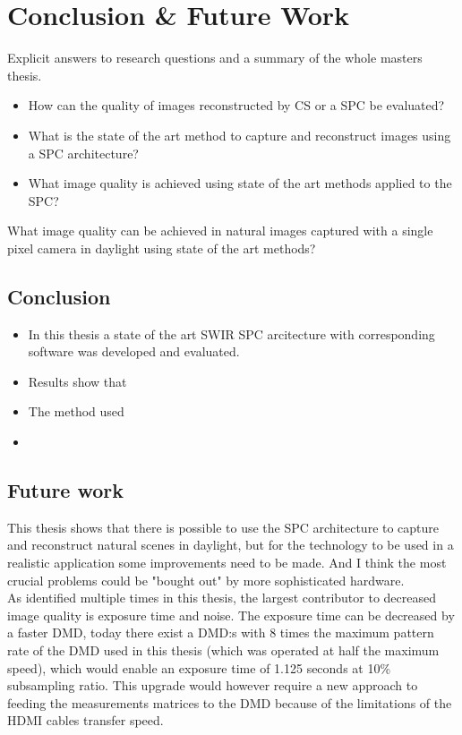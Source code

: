 \section{Conclusion \& Future Work}
Explicit answers to research questions and a summary of the whole masters thesis.

\begin{itemize}
    \item How can the quality of images reconstructed by CS or a SPC be evaluated?
    \item What is the state of the art method to capture and reconstruct images using a SPC architecture?
    \item What image quality is achieved using state of the art methods applied to the SPC?
\end{itemize}

What image quality can be achieved in natural images captured with a single pixel camera in daylight using state of the art methods? 

\subsection{Conclusion}
\begin{itemize}
\item In this thesis a state of the art SWIR SPC arcitecture with corresponding software was developed and evaluated. 

\item Results show that

\item The method used

\item 
\end{itemize}




\subsection{Future work}
This thesis shows that there is possible to use the SPC architecture to capture and reconstruct natural scenes in daylight, but for the technology to be used in a realistic application some improvements need to be made. And I think the most crucial problems could be "bought out" by more sophisticated hardware.\\[0.1in]

As identified multiple times in this thesis, the largest contributor to decreased image quality is exposure time and noise. The exposure time can be decreased by a faster DMD, today there exist a DMD:s with 8 times the maximum pattern rate of the DMD used in this thesis (which was operated at half the maximum speed), which would enable an exposure time of 1.125 seconds at 10\% subsampling ratio. This upgrade would however require a new approach to feeding the measurements matrices to the DMD because of the limitations of the HDMI cables transfer speed.\\[0.1in]

